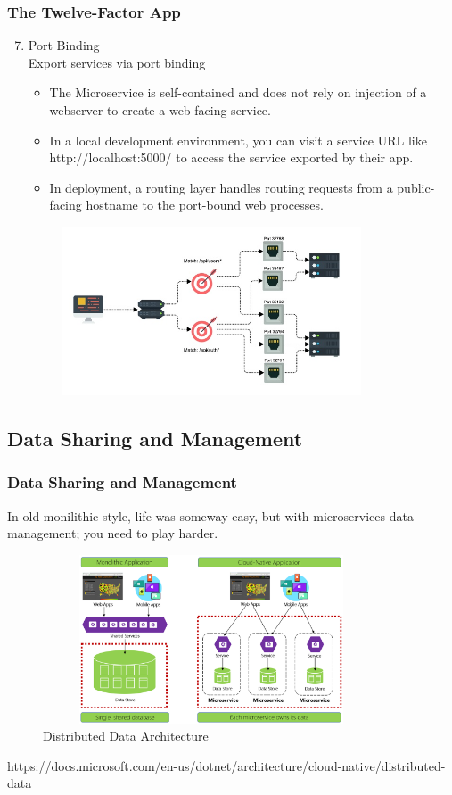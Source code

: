 \documentclass{beamer}
\begin{document}
	\begin{frame}
		\frametitle{The Twelve-Factor App}
			\begin{enumerate}
				\setcounter{enumi}{6}
				\item Port Binding \\
				\hspace{2mm} \scriptsize{Export services via port binding}
				\vspace{1mm}
				\begin{itemize}
					\item<1-> \scriptsize {The Microservice is self-contained and does not rely on injection of a webserver to create a web-facing service.}
					\item<2-> \scriptsize {In a local development environment, you can visit a service URL like http://localhost:5000/ to access the service exported by their app.}
					\item<3-> \scriptsize {In deployment, a routing layer handles routing requests from a public-facing hostname to the port-bound web processes.}
				\end{itemize}
			\end{enumerate}
			\begin{figure}[h]
				\includegraphics[width=100mm,height= 50mm, scale=1]{img/port-binding.jpg}
			\end{figure}
	\end{frame}

	\subsection {Data Sharing and Management}
		\begin{frame}
			\frametitle{Data Sharing and Management}
				In old monilithic style, life was someway easy, but with microservices data management; you need to play harder.
				
				\begin{figure}[h]
					\includegraphics[width=100mm,height= 50mm, scale=1]{img/distributed-data.png}
					\caption{Distributed Data Architecture}
				\end{figure}
			\tiny{https://docs.microsoft.com/en-us/dotnet/architecture/cloud-native/distributed-data}	
		\end{frame}
	
\end{document}
